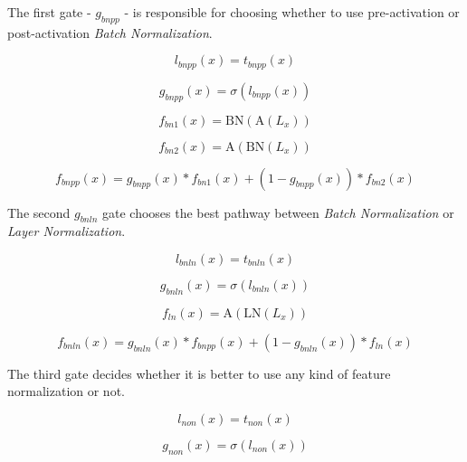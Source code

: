 \documentclass[11pt]{article}
\begin{document}
The first gate - \(g_{bnpp}\) - is responsible for choosing whether to
use pre-activation or post-activation \emph{Batch Normalization}.

\begin{equation}
  l_{bnpp}(x) = t_{bnpp}(x)
\end{equation}

\begin{equation}
  g_{bnpp}(x) = \sigma(l_{bnpp}(x))
\end{equation}

\begin{equation}
  f_{bn1}(x)= \text{BN}(\text{A}(L_x))
\end{equation}

\begin{equation}
   f_{bn2}(x) = \text{A}(\text{BN}(L_x)) 
\end{equation}

\begin{equation}
  f_{bnpp}(x) = g_{bnpp}(x) * f_{bn1}(x) +  (1-g_{bnpp}(x)) * f_{bn2}(x)
\end{equation}

The second \(g_{bnln}\) gate chooses the best pathway between
\emph{Batch Normalization} or \emph{Layer Normalization}.

\begin{equation}
l_{bnln}(x) = t_{bnln}(x)
\end{equation}

\begin{equation}
 g_{bnln}(x) = \sigma(l_{bnln}(x))
\end{equation}

\begin{equation}
 f_{ln}(x) = \text{A}(\text{LN}(L_x))
\end{equation}

\begin{equation}
 f_{bnln}(x) = g_{bnln}(x) * f_{bnpp}(x) + (1-g_{bnln}(x)) * f_{ln}(x)
\end{equation}

The third gate decides whether it is better to use any kind of feature
normalization or not.

\begin{equation}
l_{non}(x) = t_{non}(x)
\end{equation}

\begin{equation}
g_{non}(x) = \sigma(l_{non}(x))
\end{equation}
\end{document}
